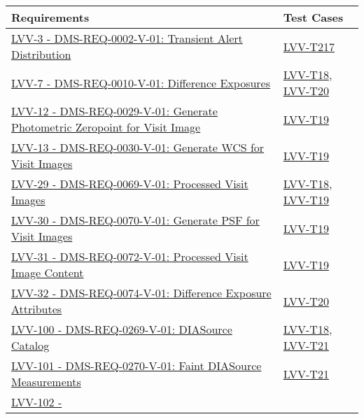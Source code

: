 \begin{longtable}[]{p{13cm}p{3cm}}
\toprule
Requirements & Test Cases\tabularnewline
\midrule
\endhead
\href{https://jira.lsstcorp.org/browse/LVV-3}{LVV-3 - DMS-REQ-0002-V-01:
Transient Alert Distribution} &
\protect\hyperlink{lvv-t217---ad-00-05-full-stream-alert-distribution}{LVV-T217}\tabularnewline
\href{https://jira.lsstcorp.org/browse/LVV-7}{LVV-7 - DMS-REQ-0010-V-01:
Difference Exposures} &
\protect\hyperlink{lvv-t18---ag-00-05-alert-generation-produces-required-data-products}{LVV-T18},
\protect\hyperlink{lvv-t20---ag-00-15-scientific-verification-of-difference-images}{LVV-T20}\tabularnewline
\href{https://jira.lsstcorp.org/browse/LVV-12}{LVV-12 -
DMS-REQ-0029-V-01: Generate Photometric Zeropoint for Visit Image} &
\protect\hyperlink{lvv-t19---ag-00-10-scientific-verification-of-processed-visit-images}{LVV-T19}\tabularnewline
\href{https://jira.lsstcorp.org/browse/LVV-13}{LVV-13 -
DMS-REQ-0030-V-01: Generate WCS for Visit Images} &
\protect\hyperlink{lvv-t19---ag-00-10-scientific-verification-of-processed-visit-images}{LVV-T19}\tabularnewline
\href{https://jira.lsstcorp.org/browse/LVV-29}{LVV-29 -
DMS-REQ-0069-V-01: Processed Visit Images} &
\protect\hyperlink{lvv-t18---ag-00-05-alert-generation-produces-required-data-products}{LVV-T18},
\protect\hyperlink{lvv-t19---ag-00-10-scientific-verification-of-processed-visit-images}{LVV-T19}\tabularnewline
\href{https://jira.lsstcorp.org/browse/LVV-30}{LVV-30 -
DMS-REQ-0070-V-01: Generate PSF for Visit Images} &
\protect\hyperlink{lvv-t19---ag-00-10-scientific-verification-of-processed-visit-images}{LVV-T19}\tabularnewline
\href{https://jira.lsstcorp.org/browse/LVV-31}{LVV-31 -
DMS-REQ-0072-V-01: Processed Visit Image Content} &
\protect\hyperlink{lvv-t19---ag-00-10-scientific-verification-of-processed-visit-images}{LVV-T19}\tabularnewline
\href{https://jira.lsstcorp.org/browse/LVV-32}{LVV-32 -
DMS-REQ-0074-V-01: Difference Exposure Attributes} &
\protect\hyperlink{lvv-t20---ag-00-15-scientific-verification-of-difference-images}{LVV-T20}\tabularnewline
\href{https://jira.lsstcorp.org/browse/LVV-100}{LVV-100 -
DMS-REQ-0269-V-01: DIASource Catalog} &
\protect\hyperlink{lvv-t18---ag-00-05-alert-generation-produces-required-data-products}{LVV-T18},
\protect\hyperlink{lvv-t21---ag-00-20-scientific-verification-of-diasource-catalog}{LVV-T21}\tabularnewline
\href{https://jira.lsstcorp.org/browse/LVV-101}{LVV-101 -
DMS-REQ-0270-V-01: Faint DIASource Measurements} &
\protect\hyperlink{lvv-t21---ag-00-20-scientific-verification-of-diasource-catalog}{LVV-T21}\tabularnewline
\href{https://jira.lsstcorp.org/browse/LVV-102}{LVV-102 -
}
\end{longtable}
